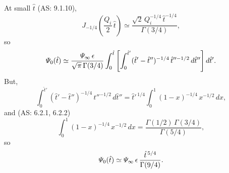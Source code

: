 \documentclass[titlepage=false,12pt]{article}
\begin{document}
At small $\hat{t}$ (AS: 9.1.10), 
\begin{equation}
J_{-1/4}\left(\frac{Q_i}{2}\,\hat{t}\right)\simeq\frac{\sqrt{2}\,Q_i^{-1/4}\,\hat{t}^{-1/4}}{\Gamma(3/4)},
\end{equation}
so
\begin{equation}
{\mit\Psi}_0(\hat{t})\simeq \frac{{\mit\Psi}_\infty\,\epsilon}{\sqrt{\pi}\,\Gamma(3/4)}
\int_0^{\hat{t}}\left[\int_0^{\hat{t}'}(\hat{t}'-\hat{t}'')^{-1/4}\,\hat{t}''^{-1/2}\,d\hat{t}''\right]d\hat{t}'.
\end{equation}
But,
\begin{equation}
\int_0^{\hat{t}'}(\hat{t}'-\hat{t}'')^{-1/4}\,\hat{t}''^{-1/2}\,d\hat{t}''=\hat{t}'^{\,1/4}\int_0^1(1-x)^{-1/4}\,x^{-1/2}\,dx,
\end{equation}
and (AS: 6.2.1, 6.2.2)
\begin{equation}
\int_0^1(1-x)^{-1/4}\,x^{-1/2}\,dx =\frac{\Gamma(1/2)\,\Gamma(3/4)}{\Gamma(5/4)},
\end{equation}
so
\begin{equation}
{\mit\Psi}_0(\hat{t})\simeq {\mit\Psi}_\infty\,\epsilon\,\frac{\hat{t}^{\,5/4}}{\Gamma(9/4)}.
\end{equation}
\end{document}
